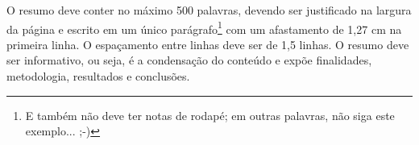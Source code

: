 \begin{resumo}

O resumo deve conter no máximo 500 palavras, devendo ser justificado na largura da página e escrito em um único parágrafo\footnote{E também não deve ter notas de rodapé; em outras palavras, não siga este exemplo... ;-)} com um afastamento de 1,27 cm na primeira linha. O espaçamento entre linhas deve ser de 1,5 linhas. O resumo deve ser informativo, ou seja, é a condensação do conteúdo e expõe finalidades, metodologia, resultados e conclusões.

\lipsum[10-13]	%

\end{resumo}
